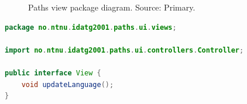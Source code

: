 \documentclass[British]{article}
\begin{document}
\begin{figure}[H]
\centering
{}
    \caption
    {Paths view package diagram. Source: Primary.}
\end{figure}

\newpage

\begin{lstlisting}[language=Java,caption={View Interface. Source: Primary.}]
package no.ntnu.idatg2001.paths.ui.views;

import no.ntnu.idatg2001.paths.ui.controllers.Controller;

public interface View {
    void updateLanguage();
}
\end{lstlisting}
\end{document}

